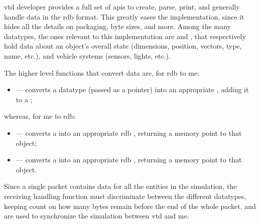 \gls{vtd} developer  provides a full set of \glspl{api} to create, parse, print, and generally handle data in the \gls{rdb} format. This greatly eases the implementation, since it hides all the details on packaging, byte sizes, and more. Among the many datatypes, the ones relevant to this implementation are  and , that respectively hold data about an object's overall state (dimensions, position, vectors, type, name, etc.), and vehicle systems (sensors, lights, etc.).

The higher level functions that convert data are, for \gls{rdb} to \gls{me}:

\begin{itemize}
	\item {} --- converts a datatype (passed as a pointer) into an appropriate , adding it to a ;
\end{itemize}

\FLOATnoindent whereas, for \gls{me} to \gls{rdb}:

\begin{itemize}
	\item {} --- converts a  into an appropriate \gls{rdb} , returning a memory point to that object;
	\item {} --- converts a  into an appropriate \gls{rdb} , returning a memory point to that object.
\end{itemize}

Since a single  \gls{packet} contains data for all the entities in the simulation, the receiving handling function must discriminate between the different datatypes, keeping count on how many bytes remain before the end of the whole \gls{packet}.  and  are used to synchronize the simulation between \gls{vtd} and \gls{me}.

